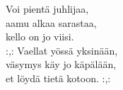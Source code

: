 
            Voi pientä juhlijaa, \\
            aamu alkaa sarastaa, \\
            kello on jo viisi. \\
            :,: Vaellat yössä yksinään, \\
            väsymys käy jo käpälään, \\
            et löydä tietä kotoon. :,: \\
